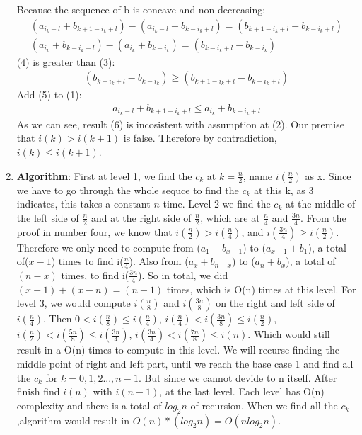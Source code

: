 \documentclass{article}
\begin{document}
\begin{enumerate}
Because the sequence of b is concave and non decreasing:
\begin{gather}
    (a_{i_k-l} + b_{k+1-i_k +l}) - (a_{i_k-l} + b_{k-i_k+l}) = (b_{k+1-i_k+l}-b_{k-i_k+l})\\
    (a_{i_k} + b_{k-i_k+l}) - (a_{i_k} + b_{k-i_k}) = (b_{k-i_k +l} - b_{k-i_k})
\end{gather}
(4) is greater than (3):
\begin{gather}
    (b_{k-i_k +l} - b_{k-i_k}) \geq (b_{k+1-i_k+l}-b_{k-i_k+l})
\end{gather}
Add (5) to (1):
\begin{gather}
     a_{i_k-l} + b_{k+1-i_k +l} \leq a_{i_k} + b_{k-i_k +l}
\end{gather}
As we can see, result (6) is incosistent with assumption at (2). Our premise that
$i(k) >i(k+1)$ is false. Therefore by contradiction,
$i(k) \leq i(k+1)$.
\item \textbf{Algorithm}: First at level 1, we find the $c_k$ at $k= \frac{n}{2}$, name 
$i(\frac{n}{2})$ as x. Since we have to go through the whole sequce to find the $c_k$
at this k, as 3 indicates, this takes a constant $n$ time. Level 2 we find the $c_k$
at the middle of the left side of $\frac{n}{2}$ and at the right side of $\frac{n}{2}$,
which are at $\frac{n}{4}$ and $\frac{3n}{4}$. From the proof in number four, we know
that $i(\frac{n}{2}) > i(\frac{n}{4}) $, and $i(\frac{3n}{4}) \geq i(\frac{n}{2})$.
Therefore  we only need to compute from ($a_1+ b_{x-1}$) to ($a_{x-1} + b_1$), a total of($x-1$)
times to find i($\frac{n}{4}$). Also from ($a_x + b_{n -x}$) to ($a_n + b_{x}$), a total of
$(n-x)$ times, to find i($\frac{3n}{4}$). So in total, we did $(x -1) + (x-n) = (n-1)$ times, 
which is O(n) times at this level. For level 3, we would compute $i(\frac{n}{8})$ and $i(\frac{3n}{8})$
on the right and left side of $i(\frac{n}{4})$. Then $0 <i(\frac{n}{8}) \leq i(\frac{n}{4})$,
$ i(\frac{n}{4})<i( \frac{3n}{8}) \leq i(\frac{n}{2})$, $ i(\frac{n}{2}) <i( \frac{5n}{8}) \leq i(\frac{3n}{4})$,
$ i(\frac{3n}{4}) <i( \frac{7n}{8}) \leq i(n)$. Which would still result in a O(n) times to compute
in this level.  We will recurse finding the middle point of right and left part, until
we reach the base case 1 and find all the $c_k$ for $k = 0,1,2...,n-1$. But since we cannot 
devide to n itself. After finish find $i(n)$ with $i(n-1)$, at the last level. 
Each level has O(n) complexity and there is a total of $log_2 n$ of recursion. 
When we find all the $c_k$,algorithm would result in $O(n)*(log_2n) = O(nlog_2n)$.\\


\end{enumerate}
\end{document}
